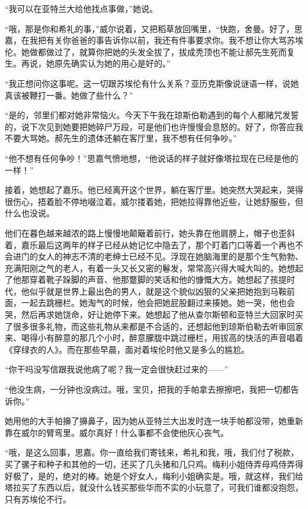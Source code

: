 \par “我可以在亚特兰大给他找点事做，”她说。
\par “哦，那是你和希礼的事，”威尔说着，又把稻草放回嘴里，“快跑，舍曼。好了，思嘉，在我把有关你爸爸的事告诉你以前，我还有件事要求你。我不想让你大骂苏埃伦。她做都做过了，就算你把她的头发全拔了，拔成秃顶也不能让郝先生死而复生。再说，她原先确实认为她的用心是好的。”
\par “我正想问你这事呢。这一切跟苏埃伦有什么关系？亚历克斯像说谜语一样，说她真该被鞭打一番。她做了些什么？”
\par “是的，邻里们都对她非常恼火。今天下午我在琼斯伯勒遇到的每个人都赌咒发誓的，说下次见到她要把她碎尸万段，可是他们也许慢慢会息怒的。好了，你答应我不要大骂她。郝先生的遗体还躺在客厅里，我不想有任何争吵。”
\par “他不想有任何争吵！”思嘉气愤地想，“他说话的样子就好像塔拉现在已经是他的一样！”
\par 接着，她想起了嘉乐。他已经离开这个世界，躺在客厅里。她突然大哭起来，哭得很伤心，捂着脸不停地啜泣着。威尔搂着她，把她拉得靠他近些，让她舒服些，但什么也没说。
\par 他们在暮色越来越浓的路上慢慢地颠簸着前行，她头靠在他肩膀上，帽子也歪斜着，嘉乐最后这两年的样子已经从她记忆中隐去了，那个盯着门口等着一个再也不会进门的女人的神志不清的老绅士已经不见。浮现在她脑海里的是那个生气勃勃、充满阳刚之气的老人，有着一头又长又密的鬈发，常常高兴得大喊大叫的。她想起了他那穿着靴子跺脚的声音、他那蹩脚的笑话和他的慷慨大方。她想起了孩提时代，他似乎就是世界上最出色的男人，就是这个貌似凶狠的父亲把她抱到马鞍前面，一起去跳栅栏。她淘气的时候，他会把她屁股翻过来揍她。她一哭，他也会哭，然后再求她饶命，好让她停下来。她想起了他从查尔斯顿和亚特兰大回家时买了很多很多礼物，而这些礼物从来都是不合适的，还想起他到琼斯伯勒去听审回家来、喝得小有醉意的那几个小时，醉意朦胧中跳过栅栏，用拔高的快活的声音唱着《穿绿衣的人》。而在那些早晨，面对着埃伦时他又是多么的尴尬。
\par “你干吗没写信跟我说他病了呢？我一定会很快赶过来的——”
\par “他没生病，一分钟也没病过。哦，宝贝，把我的手帕拿去擦擦吧，我把一切都告诉你。”
\par 她用他的大手帕擤了擤鼻子，因为她从亚特兰大出发时连一块手帕都没带，她重新靠在威尔的臂弯里。威尔真好！什么事都不会使他灰心丧气。
\par “哦，是这么回事，思嘉。你一直给我们寄钱来，希礼和我，哦，我们付了税款，买了骡子和种子和其他的一切，还买了几头猪和几只鸡。梅利小姐侍弄母鸡侍弄得好极了，是的，绝对的棒。她是个好女人，梅利小姐确实是。哦，就这样，我们给塔拉买了东西以后，就没什么钱买那些华而不实的小玩意了，可我们谁都没抱怨，只有苏埃伦不行。
